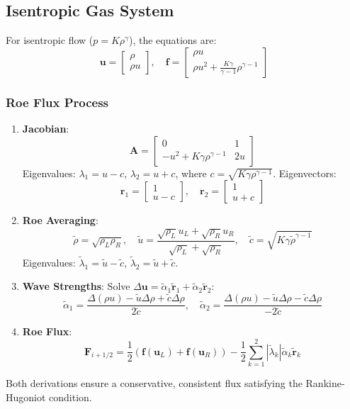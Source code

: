 \documentclass[12pt]{article}
\begin{document}
\subsection*{Isentropic Gas System}
For isentropic flow (\(p = K \rho^\gamma\)), the equations are:
\[
\mathbf{u} = \begin{bmatrix} \rho \\ \rho u \end{bmatrix}, \quad \mathbf{f} = \begin{bmatrix} \rho u \\ \rho u^2 + \frac{K \gamma}{\gamma-1} \rho^{\gamma-1} \end{bmatrix}
\]

\subsubsection*{Roe Flux Process}
\begin{enumerate}
    \item \textbf{Jacobian}:
    \[
    \mathbf{A} = \begin{bmatrix} 0 & 1 \\ -u^2 + K \gamma \rho^{\gamma-1} & 2u \end{bmatrix}
    \]
    Eigenvalues: \(\lambda_1 = u - c\), \(\lambda_2 = u + c\), where \(c = \sqrt{K \gamma \rho^{\gamma-1}}\). Eigenvectors:
    \[
    \mathbf{r}_1 = \begin{bmatrix} 1 \\ u - c \end{bmatrix}, \quad \mathbf{r}_2 = \begin{bmatrix} 1 \\ u + c \end{bmatrix}
    \]

    \item \textbf{Roe Averaging}:
    \[
    \tilde{\rho} = \sqrt{\rho_L \rho_R}, \quad \tilde{u} = \frac{\sqrt{\rho_L} u_L + \sqrt{\rho_R} u_R}{\sqrt{\rho_L} + \sqrt{\rho_R}}, \quad \tilde{c} = \sqrt{K \gamma \tilde{\rho}^{\gamma-1}}
    \]
    Eigenvalues: \(\tilde{\lambda}_1 = \tilde{u} - \tilde{c}\), \(\tilde{\lambda}_2 = \tilde{u} + \tilde{c}\).

    \item \textbf{Wave Strengths}: Solve \(\Delta \mathbf{u} = \tilde{\alpha}_1 \tilde{\mathbf{r}}_1 + \tilde{\alpha}_2 \tilde{\mathbf{r}}_2\):
    \[
    \tilde{\alpha}_1 = \frac{\Delta (\rho u) - \tilde{u} \Delta \rho + \tilde{c} \Delta \rho}{2 \tilde{c}}, \quad \tilde{\alpha}_2 = \frac{\Delta (\rho u) - \tilde{u} \Delta \rho - \tilde{c} \Delta \rho}{-2 \tilde{c}}
    \]

    \item \textbf{Roe Flux}:
    \[
    \mathbf{F}_{i+1/2} = \frac{1}{2} \left( \mathbf{f}(\mathbf{u}_L) + \mathbf{f}(\mathbf{u}_R) \right) - \frac{1}{2} \sum_{k=1}^2 |\tilde{\lambda}_k| \tilde{\alpha}_k \tilde{\mathbf{r}}_k
    \]
\end{enumerate}

Both derivations ensure a conservative, consistent flux satisfying the Rankine-Hugoniot condition.
\end{document}
